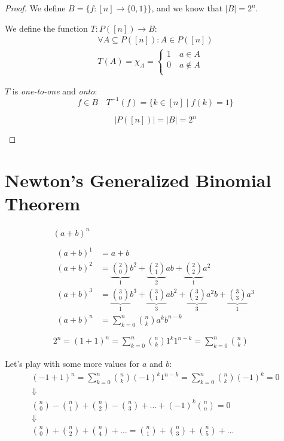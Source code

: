 \documentclass[00_complete]{subfiles}
\begin{document}
\begin{proof}
We define $B = \{f:[n] \to \{0,1\}\}$, and we know that $|B|=2^n$.

We define the function $T: P([n]) \to B$:
\begin{gather*}
    \forall A \subseteq P([n]): A \in P([n]) \\
    T(A) = \chi_A = \begin{cases}
        1 \quad a \in A \\
        0 \quad a \notin A \\
    \end{cases}
\end{gather*}

$T$ is \emph{one-to-one} and \emph{onto}:
$$f \in B \quad T^{-1}(f) = \{k \in [n] \mid f(k) = 1\}$$

\begin{conclusion}
$$|P([n])|=|B|=2^n$$
\end{conclusion}
\end{proof}
\section{Newton's Generalized Binomial Theorem}

\begin{gather*}
(a+b)^n \\ \\
\begin{aligned}
    (a+b)^1 &= a+b \\
    (a+b)^2 &= \underbrace{\binom{2}{0}}_{1}b^2+ \underbrace{\binom{2}{1}}_{2}ab + \underbrace{\binom{2}{2}}_{1}a^2 \\
    (a+b)^3 &= \underbrace{\binom{3}{0}}_{1}b^3+ \underbrace{\binom{3}{1}}_{3}ab^2 + \underbrace{\binom{3}{2}}_{3}a^2b + \underbrace{\binom{3}{3}}_{1}a^3 \\
    (a+b)^n &= \sum_{k=0}^n \binom{n}{k} a^{k}b^{n-k}
\end{aligned} \\ \\
2^n = (1+1)^n= \sum_{k=0}^n \binom{n}{k}1^k1^{n-k} = \sum_{k=0}^{n} \binom{n}{k}
\end{gather*}

Let's play with some more values for $a$ and $b$:
\begin{gather*}
    (-1+1)^n=\sum_{k=0}^{n} \binom{n}{k}(-1)^k1^{n-k} =
    \sum_{k=0}^{n}\binom{n}{k}(-1)^k = 0 \\
    \Downarrow \\
    \binom{n}{0} - \binom{n}{1} + \binom{n}{2} - \binom{n}{3} + \dots +
    (-1)^k\binom{n}{n}=0 \\
    \Downarrow \\
    \binom{n}{0} + \binom{n}{2} + \binom{n}{4} + \dots = \binom{n}{1} + \binom{n}{3} +
    \binom{n}{5} + \dots
\end{gather*}
\end{document}
